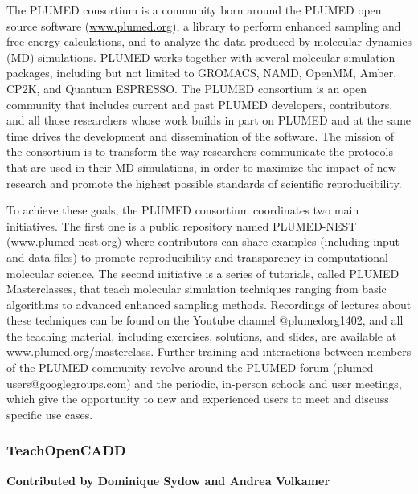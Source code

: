 \documentclass[9pt,review]{livecoms}
\begin{document}
The PLUMED consortium\cite{plumed2019promoting} is a community born around the PLUMED open source software (\href{https://www.plumed.org}{www.plumed.org})\cite{tribello2014plumed}, a library to perform enhanced sampling and free energy calculations, and to analyze the data produced by molecular dynamics (MD) simulations. PLUMED works together with several molecular simulation packages, including but not limited to GROMACS, NAMD, OpenMM, Amber, CP2K, and Quantum ESPRESSO. The PLUMED consortium  is an open community that includes current and past PLUMED developers, contributors, and all those researchers whose work builds in part on PLUMED and at the same time drives the development and dissemination of the software. The mission of the consortium is to transform the way researchers communicate the protocols that are used in their MD simulations, in order to maximize the impact of new research and promote the highest possible standards of scientific reproducibility. 

To achieve these goals, the PLUMED consortium coordinates two main initiatives. The first one is a public repository named PLUMED-NEST (\href{https://www.plumed-nest.org}{www.plumed-nest.org}) where contributors can share examples (including input and data files) to promote reproducibility and transparency in computational molecular science. The second initiative is a series of tutorials, called PLUMED Masterclasses, that teach molecular simulation techniques ranging from basic algorithms to advanced enhanced sampling methods. Recordings of lectures about these techniques can be found on the Youtube channel @plumedorg1402, and all the teaching material, including exercises, solutions, and slides, are available at www.plumed.org/masterclass. Further training and interactions between members of the PLUMED community revolve around the PLUMED forum (plumed-users@googlegroups.com) and the periodic, in-person schools and user meetings, which give the opportunity to new and experienced users to meet and discuss specific use cases.

\subsubsection{TeachOpenCADD}
\textbf{Contributed by Dominique Sydow and Andrea Volkamer}
\end{document}
